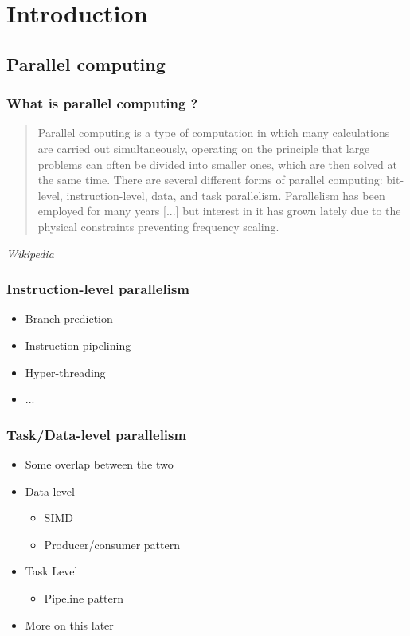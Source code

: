 \section{Introduction}
\label{sec:intro}



\subsection{Parallel computing}

\begin{frame}
  \frametitle{What is parallel computing ?}

  \begin{quotation}
    Parallel computing is a type of computation in which many calculations are carried out simultaneously, operating on the principle that large problems can often be divided into smaller ones, which are then solved at the same time.
    There are several different forms of parallel computing: bit-level, instruction-level, data, and task parallelism.
    Parallelism has been employed for many years [...] but interest in it has grown lately due to the physical constraints preventing frequency scaling.
  \end{quotation}
  \emph{Wikipedia}
\end{frame}

\begin{frame}
  \frametitle{Instruction-level parallelism}
  \begin{itemize}
  \item Branch prediction
  \item Instruction pipelining
  \item Hyper-threading
  \item ...
  \end{itemize}
\end{frame}

\begin{frame}
  \frametitle{Task/Data-level parallelism}
  \begin{itemize}
  \item Some overlap between the two
  \item Data-level
    \begin{itemize}
    \item SIMD
    \item Producer/consumer pattern
    \end{itemize}
  \item Task Level
    \begin{itemize}
    \item Pipeline pattern
    \end{itemize}
  \item More on this later
  \end{itemize}
\end{frame}


